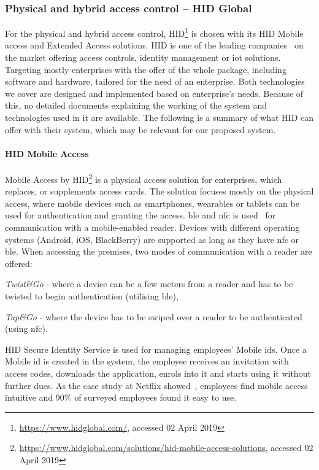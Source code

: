 \subsubsection{Physical and hybrid access control -- HID Global} \label{sec:pacs-hid}

For the physical and hybrid access control, HID\footnote{\url{https://www.hidglobal.com/}, accessed 02 April 2019} is chosen with its HID Mobile access and Extended Access solutions. HID is one of the leading companies~\cite{TopManufacturers} on the market offering access controls, identity management or \acrshort{iot} solutions. Targeting mostly enterprises with the offer of the whole package, including software and hardware, tailored for the need of an enterprise. Both technologies we cover are designed and implemented based on enterprise’s needs. Because of this, no detailed documents explaining the working of the system and technologies used in it are available. The following is a summary of what HID can offer with their system, which may be relevant for our proposed system.

\paragraph{HID Mobile Access}
Mobile Access by HID\footnote{\url{https://www.hidglobal.com/solutions/hid-mobile-access-solutions}, accessed 02 April 2019} is a physical access solution for enterprises, which replaces, or supplements access cards. The solution focuses mostly on the physical access, where mobile devices such as smartphones, wearables or tablets can be used for authentication and granting the access. \acrshort{ble} and \acrshort{nfc} is used~\cite{HIDGlobal2014HIDGlobal} for communication with a mobile-enabled reader. Devices with different operating systems (Android, iOS, BlackBerry) are supported as long as they have \acrshort{nfc} or \acrshort{ble}. When accessing the premises, two modes of communication with a reader are offered: 
%
\begin{enumerate*}[label=(\roman*)]
    \item \textit{Twist\&Go} - where a device can be a few meters from a reader and has to be twisted to begin authentication (utilising \acrshort{ble}),
    \item \textit{Tap\&Go} - where the device has to be swiped over a reader to be authenticated (using \acrshort{nfc}).
\end{enumerate*}
%
HID Secure Identity Service is used for managing employees’ Mobile \acrshort{id}s. Once a Mobile \acrshort{id} is created in the system, the employee receives an invitation with access codes, downloads the application, enrols into it and starts using it without further dues. As the case study at Netflix showed~\cite{2012NetflixPilot}, employees find mobile access intuitive and 90\% of surveyed employees found it easy to use.

